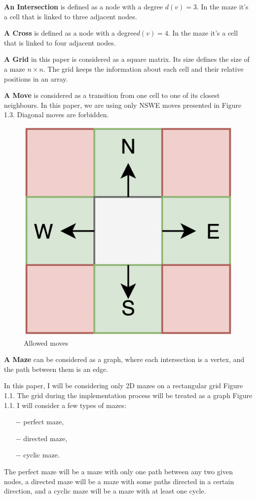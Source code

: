 \begin{definition}\textbf{An Intersection} is defined as a node with a degree $d(v) = 3$. In the maze it's a cell that is linked to three adjacent nodes.\end{definition}
\begin{definition}\textbf{A Cross} is defined as a node with a degree$d(v) = 4$. In the maze it's a cell that is linked to four adjacent nodes. \end{definition}
\begin{definition}\textbf{A Grid} in this paper is considered as a square matrix. Its size defines the size of a maze $n \times n$. The grid keeps the information about each cell and their relative positions in an array.\end{definition}
\begin{definition}\textbf{A Move} is considered as a transition from one cell to one of its closest neighbours. In this paper, we are using only NSWE moves presented in Figure 1.3. Diagonal moves are forbidden.
\newline
\begin{figure}[h]
	\centering
	\includegraphics[width=.2\linewidth]{moves}
	\caption{Allowed moves}
\end{figure}		
\end{definition}
\newpage
\begin{definition}\textbf{A Maze} can be considered as a graph, where each intersection is a vertex, and the path between them is an edge. \end{definition}
In this paper, I will be considering only 2D mazes on a rectangular grid Figure 1.1. The grid during the implementation process will be treated as a graph Figure 1.1. I will consider a few types of mazes:
 \begin{itemize}
 \item[$-$] perfect maze,
 \item[$-$] directed maze,
 \item[$-$] cyclic maze.
 \end{itemize}
 The perfect maze will be a maze with only one path between any two given nodes, a directed maze will be a maze with some paths directed in a certain direction, and a cyclic maze will be a maze with at least one cycle. 
